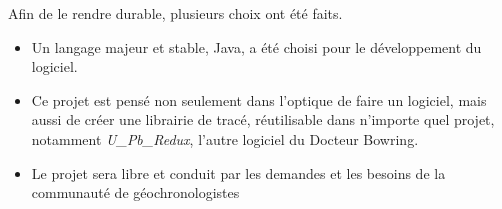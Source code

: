 Afin de le rendre durable, plusieurs choix ont été faits. 
\begin{itemize}
\item Un langage majeur et stable, Java, a été choisi pour le développement du logiciel.
\item Ce projet est pensé non seulement dans l'optique de faire un logiciel, mais aussi de créer une librairie de tracé, réutilisable dans n'importe quel projet, notamment \textit{U\_Pb\_Redux}, l'autre logiciel du Docteur Bowring.
\item Le projet sera libre et conduit par les demandes et les besoins de la communauté de géochronologistes
\end{itemize}
